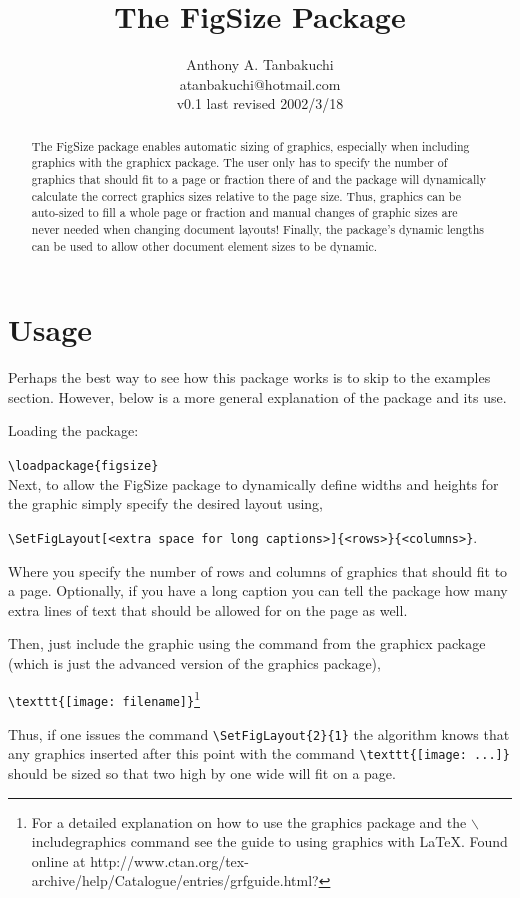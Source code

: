 \documentclass{article}
\title{The FigSize Package}
\author{Anthony A. Tanbakuchi \\{\small atanbakuchi@hotmail.com} \\ v0.1 last revised 2002/3/18}
\date{}
\begin{document}
\maketitle
\begin{abstract}
The FigSize package enables automatic sizing of graphics,
especially when including graphics with the graphicx package.  The
user only has to specify the number of graphics that should fit to
a page or fraction there of and the package will dynamically
calculate the correct graphics sizes relative to the page size.
Thus, graphics can be auto-sized to fill a whole page or fraction
and manual changes of graphic sizes are never needed when changing
document layouts!  Finally, the package's dynamic lengths can be
used to allow other document element sizes to be dynamic.
\end{abstract}

\section{Usage}

Perhaps the best way to see how this package works is to skip to
the examples section.  However, below is a more general
explanation of the package and its use.

Loading the package:

    \verb"\loadpackage{figsize}"\\

Next, to allow the FigSize package to dynamically define widths
and heights for the graphic simply specify the desired layout
using,


    \verb"\SetFigLayout[<extra space for long captions>]{<rows>}{<columns>}".

Where you specify the number of rows and columns of graphics that
should fit to a page.  Optionally, if you have a long caption you
can tell the package how many extra lines of text that should be
allowed for on the page as well.

Then, just include the graphic using the command from the graphicx
package (which is just the advanced version of the graphics
package),

\verb"\texttt{[image: filename]}"\footnote{For a detailed
explanation on how to use the graphics package and the
$\backslash$includegraphics command see the guide to using
graphics with \LaTeX. Found online at
http://www.ctan.org/tex-archive/help/Catalogue/entries/grfguide.html?}

Thus, if one issues the command \verb"\SetFigLayout{2}{1}" the
algorithm knows that any graphics inserted after this point with
the command \verb"\texttt{[image: ...]}" should be sized so that
two high by one wide will fit on a page.
\end{document}
